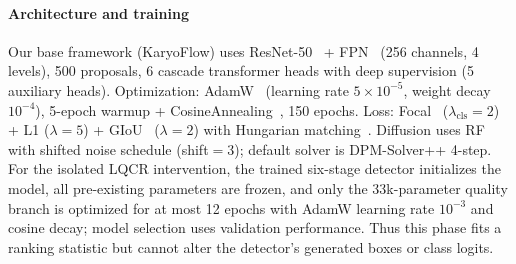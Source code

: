 \documentclass[journal,10pt]{IEEEtran}
\theoremstyle{definition}
\begin{document}
\begin{table}[t]
  \centering
  \small
  \caption{Held-out-test properties that motivate the detector design. Relative
  area is box area divided by image area; small follows the COCO absolute-area
  threshold ($<32^2$ pixels); overlap denotes an image containing at least one
  pair of ground-truth boxes with IoU $>0.1$.}
  \label{tab:dataset-properties}
  \setlength{\tabcolsep}{3pt}
\end{table}

\paragraph{Architecture and training}
Our base framework (KaryoFlow) uses ResNet-50~\cite{he2016resnet} + FPN~\cite{lin2017fpn}
(256 channels, 4 levels), 500 proposals, 6 cascade transformer heads with
deep supervision (5 auxiliary heads). Optimization: AdamW~\cite{loshchilov2019adamw}
(learning rate $5{\times}10^{-5}$, weight decay $10^{-4}$), 5-epoch warmup + CosineAnnealing~\cite{loshchilov2017sgdr},
150 epochs. Loss: Focal~\cite{lin2017focal} ($\lambda_{\text{cls}}{=}2$) +
L1 ($\lambda{=}5$) + GIoU~\cite{rezatofighi2019giou} ($\lambda{=}2$) with
Hungarian matching~\cite{kuhn1955assignment}. Diffusion uses RF with shifted
noise schedule (shift$=3$); default solver is DPM-Solver++ 4-step.
For the isolated LQCR intervention, the trained six-stage detector initializes the
model, all pre-existing parameters are frozen, and only the 33k-parameter
quality branch is optimized for at most 12 epochs with AdamW learning rate
$10^{-3}$ and cosine decay; model selection uses validation performance. Thus
this phase fits a ranking statistic but cannot alter the detector's generated
boxes or class logits.
\end{document}
